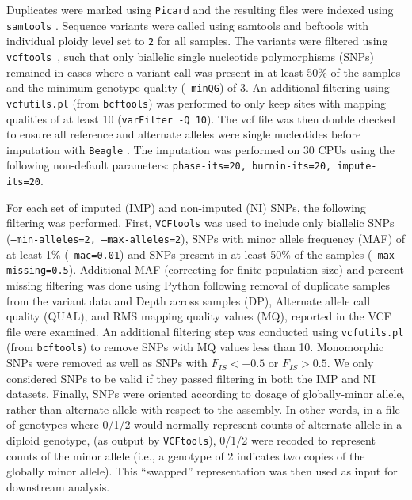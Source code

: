 \documentclass[smallextended]{svjour3}
\begin{document}
Duplicates were marked using \texttt{Picard} and the resulting files were
indexed using \texttt{samtools} \citep[][version 1.2]{Li:2009ka}.  Sequence
variants were called using samtools and bcftools \citep[][version
1.2]{Li:2009ka} with individual  ploidy level set to \texttt{2} for all samples.
The variants were filtered  using \texttt{vcftools}~\citep[][version
0.1.14]{Danecek:2011gz}, such that only biallelic single nucleotide
polymorphisms (SNPs) remained in cases where a variant call was present in at
least 50\% of the samples and the minimum genotype quality (\texttt{--minQG}) of
3. An additional filtering using \texttt{vcfutils.pl} (from \texttt{bcftools})
was performed to only keep sites with mapping qualities of at least 10
(\texttt{varFilter -Q 10}). The vcf file was then double checked to ensure all
reference and alternate alleles were single nucleotides before imputation with
\texttt{Beagle} \citep[][version 4.0, r1399]{Browning:2007ge}.  The imputation
was performed on 30 CPUs using the following non-default parameters:
\texttt{phase-its=20, burnin-its=20, impute-its=20}.

For each set of imputed (IMP) and non-imputed (NI) SNPs, the following filtering
was performed.  First, \texttt{VCFtools} was used to include only biallelic
SNPs (\texttt{--min-alleles=2, --max-alleles=2}), SNPs with minor allele
frequency (MAF) of at least 1\% (\texttt{--mac=0.01}) and SNPs present in at
least 50\% of the samples (\texttt{--max-missing=0.5}).  Additional MAF
(correcting for  finite population size) and percent missing filtering was done
using Python following removal of duplicate samples from the variant data and
Depth across samples (DP), Alternate allele call quality (QUAL), and RMS mapping
quality values (MQ), reported in the VCF file were examined.  An additional
filtering step was conducted using \texttt{vcfutils.pl} (from \texttt{bcftools})
to remove SNPs with MQ values less than 10.  Monomorphic SNPs were removed as
well as SNPs with $F_{IS} < -0.5$ or $F_{IS} > 0.5$.  We only considered SNPs
to be valid if they passed filtering in both the IMP and NI datasets. Finally,
SNPs were oriented according to dosage of globally-minor allele, rather than
alternate allele with respect to the assembly. In other words, in a file of
genotypes where 0/1/2 would normally represent counts of alternate allele in a
diploid genotype,  (as output by \texttt{VCFtools}), 0/1/2 were recoded to
represent counts of the minor allele (i.e., a genotype of 2 indicates two copies
of the globally minor allele). This ``swapped'' representation was then used as
input for downstream analysis.
\end{document}
